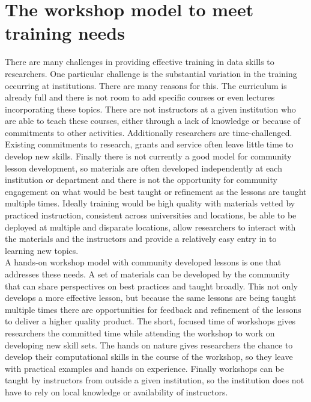\documentclass[15]{idcc}
\begin{document}
\section{The workshop model to meet training needs}

There are many challenges in providing effective training in data skills to researchers. One particular challenge is
the substantial variation in the training occurring at institutions. There are many reasons for this. The curriculum
is already full and there is not room to add specific courses or even lectures incorporating these topics. There are
not instructors at a given institution who are able to teach these courses, either through a lack of knowledge
or because of commitments to other activities. Additionally researchers are time-challenged. Existing commitments to research, grants and service often leave little time to develop new skills. Finally
there is not currently a good model for community lesson development, so materials are often developed independently at
each institution or department and there is not the opportunity for community engagement on what would be best taught or
refinement as the lessons are taught multiple times. Ideally training would
be high quality with materials vetted by practiced instruction, consistent across universities and locations, be able
to be deployed at multiple and disparate locations, allow researchers to interact with the materials and the
instructors and provide a relatively easy entry in to learning new topics.\\

A hands-on workshop model with community developed lessons is one that addresses these needs. A set of materials can be developed by the community that can share perspectives on best practices and taught broadly. This not only develops a more effective lesson, but
because the same lessons are being taught multiple times there are opportunities for feedback and refinement of the lessons to deliver a higher quality product. The short, focused time of workshops gives researchers the committed time while attending the workshop to work on developing new skill
sets. The hands on nature gives researchers the chance to develop their computational skills in the course of the workshop, so they
leave with practical examples and hands on experience. Finally workshops can be taught by instructors from outside a given institution, so the institution does not have to rely on local knowledge or availability of instructors.\\
\end{document}
